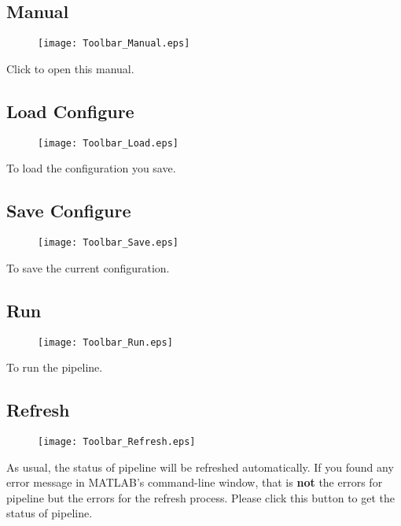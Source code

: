 \documentclass[11pt]{article}
\begin{document}
		\subsection{Manual}
			\begin{figure}
				\begin{center}
					\texttt{[image: Toolbar\_Manual.eps]}
				\end{center}
			\end{figure}
			Click to open this manual.
		\subsection{Load Configure}
			\begin{figure}
				\begin{center}
					\texttt{[image: Toolbar\_Load.eps]}
				\end{center}
			\end{figure}
			To load the configuration you save.
		\subsection{Save Configure}
			\begin{figure}
				\begin{center}
					\texttt{[image: Toolbar\_Save.eps]}
				\end{center}
			\end{figure}
			To save the current configuration.
		\subsection{Run}
			\begin{figure}
				\begin{center}
					\texttt{[image: Toolbar\_Run.eps]}
				\end{center}
			\end{figure}
			To run the pipeline.
		\subsection{Refresh}
			\begin{figure}
				\begin{center}
					\texttt{[image: Toolbar\_Refresh.eps]}
				\end{center}
			\end{figure}
			As usual, the status of pipeline will be refreshed automatically. 
			If you found any error message in MATLAB's command-line window, 
			that is \textbf{not} the errors for pipeline but the errors for the refresh process.
			Please click this button to get the status of pipeline.
\end{document}
